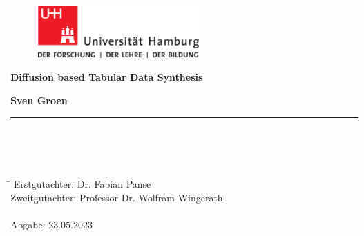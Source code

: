 \begin{titlepage}

  \setcounter{page}{-1}

	\begin{figure}[h]
		\begin{minipage}[b]{62mm}
			\includegraphics[width=62mm]{images/unilogo}
		\end{minipage}
		\hspace{4cm}
	\end{figure}

	\vfill
	
	\begin{center}
		\vspace{14mm}
		\noindent \textbf{\huge
		  Diffusion based Tabular Data Synthesis
		}
		\vspace{60mm}	
	\end{center}
	
	\vfill
	
	\noindent \textbf{Sven Groen} \\
	\noindent \rule{\textwidth}{0.4mm} 
	 \\
	 \\
	 \\
	\begin{tabbing}
	\hspace{8em} \=  \kill
	Erstgutachter: \> Dr. Fabian Panse \\
	Zweitgutachter: \> Professor Dr. Wolfram Wingerath \\
	~ \\
	Abgabe: 23.05.2023
	\end{tabbing}

\end{titlepage}

